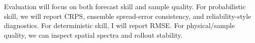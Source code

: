 \documentclass{article}
\begin{document}
Evaluation will focus on both forecast skill and sample quality. For probabilistic skill, we will report CRPS, ensemble spread-error consistency, and reliability-style diagnostics. For deterministic skill, I will report RMSE. For physical/sample quality, we can inspect spatial spectra and rollout stability.



\end{document}
